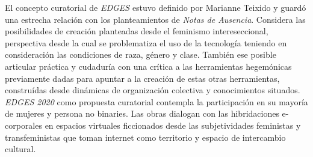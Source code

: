 
El concepto curatorial de \textit{EDGES} estuvo definido por Marianne Teixido y guardó una estrecha relación con los planteamientos de \textit{Notas de Ausencia}. Considera las posibilidades de creación planteadas desde el feminismo intereseccional, perspectiva desde la cual se problematiza el uso de la tecnología teniendo en consideración las condiciones de raza, género y clase. También ese posible articular práctica y cudaduría con una crítica a las herramientas hegemónicas previamente dadas para apuntar a la creación de estas otras herramientas, construídas desde dinámicas de organización colectiva y conocimientos situados. \textit{EDGES 2020} como propuesta curatorial contempla la participación en su mayoría de mujeres y persona no binaries. Las obras dialogan con las hibridaciones e-corporales en espacios virtuales ficcionados desde las subjetividades feministas y transfeministas que toman internet como territorio y espacio de intercambio cultural.

\iffalse
- Uso de espacios tridimensionales 
- Bots y literatura 
- Datos que transforman el espacio   
- Ensayos digitales en la web
- cyberfeminisimo
- audio virtualmente posicionado 
- streaming de audio y video sin plataformas privativas - decisiones de optimización
- Según yo aquí usamos icecast y liquid soap 
- Inicios de multiplayer
\fi

